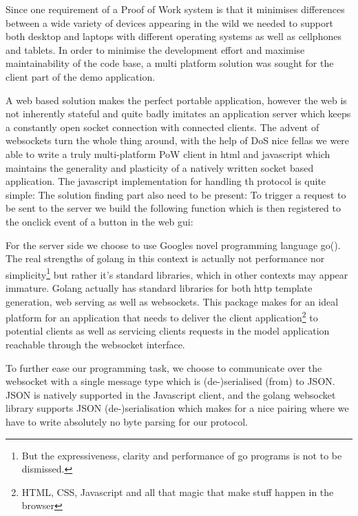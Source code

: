 Since one requirement of a Proof of Work system is that it minimises differences between a wide variety of devices appearing in the wild we needed to support both desktop and laptops with different operating systems as well as cellphones and tablets.
In order to minimise the development effort and maximise maintainability of the code base, a multi platform solution was sought for the client part of the demo application. 

A web based solution makes the perfect portable application, however the web is not inherently stateful and quite badly imitates an application server which keeps a constantly open socket connection with connected clients. The advent of websockets turn the whole thing around, with the help of DoS nice fellas we were able to write a truly multi-platform PoW client in html and javascript which maintains the generality and plasticity of a natively written socket based application. The javascript implementation for handling th protocol is quite simple:
The solution finding part also need to be present:
To trigger a request to be sent to the server we build the following function which is then registered to the onclick event of a button in the web gui:

For the server side we choose to use Googles novel programming language go(). The real strengths of golang in this context is actually not performance nor simplicity\footnote{But the expressiveness, clarity and performance of go programs is not to be dismissed.} but rather it's standard libraries, which in other contexts may appear immature. Golang actually has standard libraries for both http template generation, web serving as well as websockets. This package makes for an ideal platform for an application that needs to deliver the client application\footnote{HTML, CSS, Javascript and all that magic that make stuff happen in the browser} to potential clients as well as servicing clients requests in the model application reachable through the websocket interface. 

To further ease our programming task, we choose to communicate over the websocket with a single message type which is (de-)serialised (from) to JSON. JSON is natively supported in the Javascript client, and the golang websocket library supports JSON (de-)serialisation which makes for a nice pairing where we have to write absolutely no byte parsing for our protocol.

